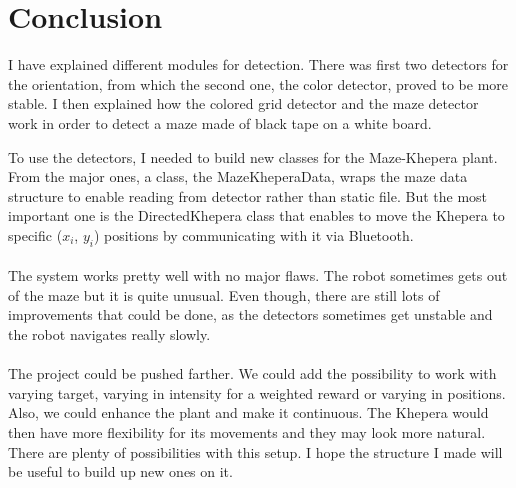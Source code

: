 \chapter{Conclusion}
\label{sec:conclusion}

I have explained different modules for detection. There was first two 
detectors for the orientation, from which the second one, the color 
detector, proved to be more stable. I then explained how the colored 
grid detector and the maze detector work in order to detect a maze made 
of black tape on a white board.

To use the detectors, I needed to build new classes for the Maze-Khepera 
plant. From the major ones, a class, the MazeKheperaData, wraps the 
maze data structure to enable reading from detector rather than static 
file. But the most important one is the DirectedKhepera class that 
enables to move the Khepera to specific ($x_i$, $y_i$) positions by 
communicating with it via Bluetooth. 
\\
\\
The system works pretty well with no major flaws. The robot sometimes 
gets out of the maze but it is quite unusual. Even though, there are 
still lots of improvements that could be done, as the detectors sometimes 
get unstable and the robot navigates really slowly. 
\\
\\
The project could be pushed farther. We could add the possibility to 
work with varying target, varying in intensity for a weighted reward or 
varying in positions. Also, we could enhance the plant and make it 
continuous. The Khepera would then have more flexibility for its 
movements and they may look more natural. There are plenty of 
possibilities with this setup. I hope the structure I made will be 
useful to build up new ones on it. 
